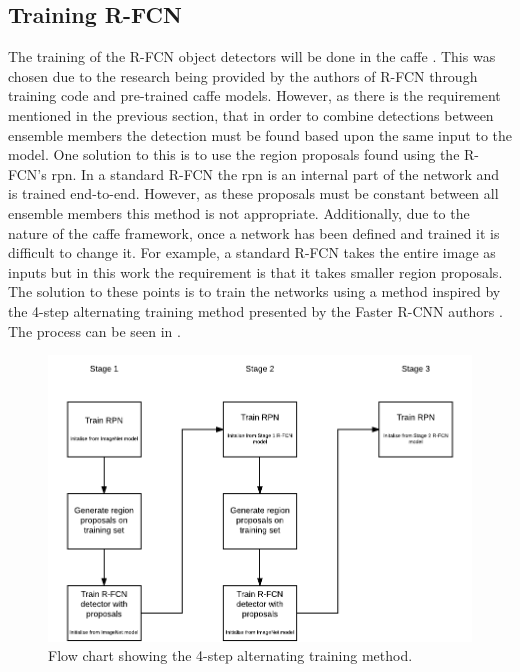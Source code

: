 \subsection{Training R-FCN}
The training of the R-FCN object detectors will be done in the \gls{caffe} \cite{caffe}. This was chosen due to the research being provided by the authors of R-FCN through training code and pre-trained \gls{caffe} models. However, as there is the requirement mentioned in the previous section, that in order to combine detections between ensemble members the detection must be found based upon the same input to the model. One solution to this is to use the region proposals found using the R-FCN's \gls{rpn}. In a standard R-FCN the \gls{rpn} is an internal part of the network and is trained end-to-end. However, as these proposals must be constant between all ensemble members this method is not appropriate. Additionally, due to the nature of the \gls{caffe} framework, once a network has been defined and trained it is difficult to change it. For example, a standard R-FCN takes the entire image as inputs but in this work the requirement is that it takes smaller region proposals. The solution to these points is to train the networks using a method inspired by the 4-step alternating training method presented by the Faster R-CNN authors \cite{fasterrcnn}. The process can be seen in .

 \begin{figure}[H]
  \centering
    \includegraphics[width=1.0\textwidth]{Figs/Design/4steptrain1.pdf}
      \caption{Flow chart showing the 4-step alternating training method.}
    \label{fig:4steptrain}
\end{figure}

